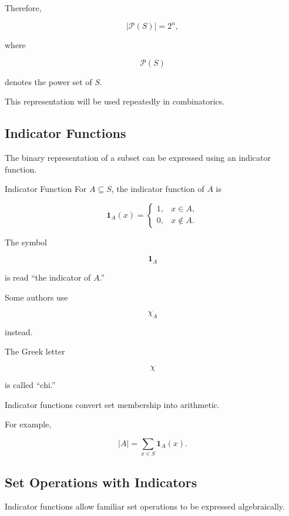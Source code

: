 Therefore,

\[
\boxed{
|\mathcal{P}(S)|=2^n,
}
\]

where

\[
\mathcal{P}(S)
\]

denotes the power set of \(S\).

This representation will be used repeatedly in combinatorics.

\subsection{Indicator Functions}
\label{subsec:indicator-functions}

The binary representation of a subset can be expressed using an
indicator function.

\begin{definitionbox}{Indicator Function}
For \(A\subseteq S\), the indicator function of \(A\) is

\[
\boxed{
\mathbf{1}_A(x)
=
\begin{cases}
1,&x\in A,\\
0,&x\notin A.
\end{cases}
}
\]
\end{definitionbox}

The symbol

\[
\mathbf{1}_A
\]

is read ``the indicator of \(A\).''

Some authors use

\[
\chi_A
\]

instead.

The Greek letter

\[
\chi
\]

is called ``chi.''

Indicator functions convert set membership into arithmetic.

For example,

\[
|A|
=
\sum_{x\in S}\mathbf{1}_A(x).
\]

\subsection{Set Operations with Indicators}
\label{subsec:set-operations-indicators}

Indicator functions allow familiar set operations to be expressed
algebraically.

